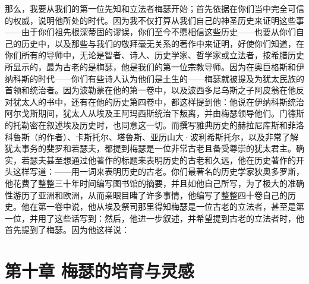 那么，我要从我们的第一位先知和立法者梅瑟开始；首先依据在你们当中完全可信的权威，说明他所处的时代。因为我不仅打算从我们自己的神圣历史来证明这些事——由于你们祖先根深蒂固的谬误，你们至今不愿相信这些历史——也要从你们自己的历史中，以及那些与我们的敬拜毫无关系的著作中来证明，好使你们知道，在你们所有的导师中，无论是智者、诗人、历史学家、哲学家或立法者，按希腊历史所显示的，最为古老的是梅瑟，他是我们的第一位宗教导师。因为在奥巨格斯和伊纳科斯的时代——你们有些诗人认为他们是土生的——梅瑟就被提及为犹太民族的首领和统治者。因为波勒蒙在他的第一卷中，以及波西多尼乌斯之子阿皮翁在他反对犹太人的书中，还有在他的历史第四卷中，都这样提到他：他说在伊纳科斯统治阿尔戈斯期间，犹太人从埃及王阿玛西斯统治下叛离，并由梅瑟领导他们。门德斯的托勒密在叙述埃及历史时，也同意这一切。而撰写雅典历史的赫拉尼库斯和菲洛科鲁斯（的作者）、卡斯托尔、塔鲁斯、亚历山大·波利希斯托尔，以及非常了解犹太事务的斐罗和若瑟夫，都提到梅瑟是一位非常古老且备受尊崇的犹太君主。确实，若瑟夫甚至想通过他著作的标题来表明历史的古老和久远，他在历史著作的开头这样写道：——用一词来表明历史的古老。你们最著名的历史学家狄奥多罗斯，他花费了整整三十年时间编写图书馆的摘要，并且如他自己所写，为了极大的准确性游历了亚洲和欧洲，从而亲眼目睹了许多事情，他编写了整整四十卷自己的历史。他在第一卷中说，他从埃及祭司那里得知梅瑟是一位古老的立法者，甚至是第一位，并用了这些话写到：然后，他进一步叙述，并希望提到古老的立法者时，他首先提到了梅瑟。因为他这样说：\par


\section{第十章  梅瑟的培育与灵感}

